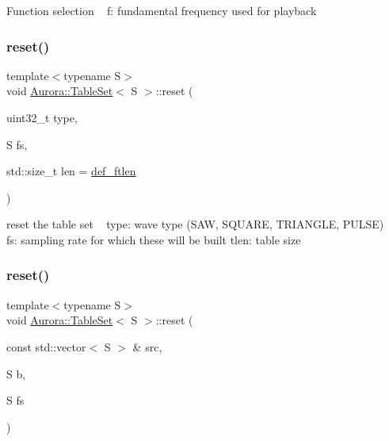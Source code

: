 Function selection ~\newline
f\+: fundamental frequency used for playback \mbox{\label{class_aurora_1_1_table_set_ac2c945c49d53f60fd909dc771a6ff7e5}} 
\subsubsection{\texorpdfstring{reset()}{reset()}\hspace{0.1cm}{\footnotesize\ttfamily [1/2]}}
{\footnotesize\ttfamily template$<$typename S$>$ \\
void \hyperlink{class_aurora_1_1_table_set}{Aurora\+::\+Table\+Set}$<$ S $>$\+::reset (\begin{DoxyParamCaption}\item[{uint32\+\_\+t}]{type,  }\item[{S}]{fs,  }\item[{std\+::size\+\_\+t}]{len = {\ttfamily \hyperlink{namespace_aurora_a14dabfd9feedfa09c0e6f86d2627f006}{def\+\_\+ftlen}} }\end{DoxyParamCaption})\hspace{0.3cm}{\ttfamily [inline]}}

reset the table set ~\newline
type\+: wave type (S\+AW, S\+Q\+U\+A\+RE, T\+R\+I\+A\+N\+G\+LE, P\+U\+L\+SE) ~\newline
fs\+: sampling rate for which these will be built tlen\+: table size \mbox{\label{class_aurora_1_1_table_set_afec852dca45285ec57b6a4a97dffac36}} 
\subsubsection{\texorpdfstring{reset()}{reset()}\hspace{0.1cm}{\footnotesize\ttfamily [2/2]}}
{\footnotesize\ttfamily template$<$typename S$>$ \\
void \hyperlink{class_aurora_1_1_table_set}{Aurora\+::\+Table\+Set}$<$ S $>$\+::reset (\begin{DoxyParamCaption}\item[{const std\+::vector$<$ S $>$ \&}]{src,  }\item[{S}]{b,  }\item[{S}]{fs }\end{DoxyParamCaption})\hspace{0.3cm}{\ttfamily [inline]}}

